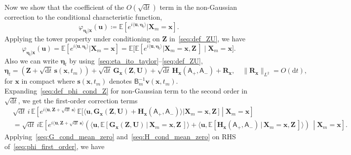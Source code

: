 \documentclass[
 longbibliography,
 twocolumn,
 superscriptaddress,
 amsmath,
 amssymb,
 amsthm,
 amsfonts,
 prl,
 floatfix,
]{revtex4-2}
\newcommand{\matbf}[1]{\boldsymbol{\mathsf{#1}}}
\begin{document}
\begin{widetext}
Now we show that the coefficient of the $O(\sqrt{\mathrm{d}t})$ term in the non-Gaussian correction to the conditional characteristic function, 
\begin{equation*}
    \varphi_{\bm\eta_t|\bm{x}}(\bm{u})\coloneq\mathbb{E}[e^{i\langle\bm{u},\bm\eta_t\rangle}|\bm{X}_m=\bm{x}].
\end{equation*}
Applying the tower property under conditioning on $\bm{Z}$ in~\eqref{seq:def_ZU}, we have
\begin{equation}
    \varphi_{\bm\eta_t|\bm{x}}(\bm{u})
    =\mathbb{E}[e^{i\langle\bm{u},\bm\eta_t\rangle}|\bm{X}_m=\bm{x}]
    =\mathbb{E}\big[
    \mathbb{E}[e^{i\langle\bm{u},\bm\eta_t\rangle}|\bm{X}_m=\bm{x},\bm{Z}\,]
    \mid\bm{X}_m=\bm{x}\big].
    \label{seq:def_phi_cond_Z}
\end{equation}
Also we can write $\bm\eta_t$ by using~\eqref{seq:eta_ito_taylor}--\eqref{seq:def_ZU},
\begin{equation*}
    \bm\eta_t=\left(\bm{Z}+\sqrt{\mathrm{d}t}\,\bm{s}(\bm{x},t_m)\right)
    +\sqrt{\mathrm{d}t}\,\bm{G}_{\bm{x}}(\bm{Z},\bm{U})
    +\sqrt{\mathrm{d}t}\,\bm{H}_{\bm{x}}(\matbf{A}_+,\matbf{A}_-)
    +\bm{R}_{\bm{x}}
    ,
    \quad
    \|\bm{R}_{\bm{x}}\|_{L^2}=O(\mathrm{d}t),
\end{equation*}
for $\bm x$ in compact where $\bm{s}(\bm x,t_m)$ denotes $\matbf{B}_m^{-1}\bm v(\bm x, t_m)$.
Expanding~\eqref{seq:def_phi_cond_Z} for non-Gaussian term to the second order in $\sqrt{\mathrm{d}t}$, we get the first-order correction terms
\begin{equation}
    \begin{aligned}
    &\sqrt{\mathrm{d}t}\,i\,\mathbb{E}\left[
    e^{i\langle \bm{u},\bm{Z}+\sqrt{\mathrm{d}t}\,\bm{s} \rangle}\,
    \mathbb{E}\big[
    \langle\bm{u},\bm{G}_{\bm{x}}(\bm{Z},\bm{U})
    +\bm{H}_{\bm{x}}(\matbf{A}_+,\matbf{A}_-)
    \rangle
    \vert\bm{X}_m=\bm{x},\bm{Z}\,\big]\middle|\bm{X}_m=\bm{x}
    \right]
    \\
    &=\sqrt{\mathrm{d}t}\,i\mathbb{E}\left[e^{i\langle \bm{u},\bm{Z}+\sqrt{\mathrm{d}t}\,\bm{s}\rangle}
    \left(\langle \bm{u},\mathbb{E}[\bm{G}_{\bm{x}}(\bm{Z},\bm{U})\,|\,\bm{X}_m=\bm{x},\bm{Z}\,]\rangle
    +\langle \bm{u},\mathbb{E}[\bm{H}_{\bm{x}}(\matbf{A}_+,\matbf{A}_-)\,|\,\bm{X}_m=\bm{x},\bm{Z}\,]\rangle
    \right)\,\middle|\bm{X}_m=\bm{x}\right].
    \end{aligned}
    \label{seq:phi_first_order}
\end{equation}
Applying~\eqref{seq:G_cond_mean_zero} and~\eqref{seq:H_cond_mean_zero} on RHS of~\eqref{seq:phi_first_order}, we have

\end{widetext}
\end{document}
